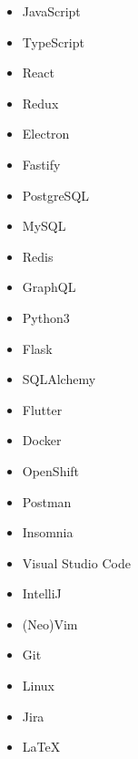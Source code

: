 

\begin{multicols}{3}
	\begin{itemize}
		\item JavaScript
		\item TypeScript
		\item React
		\item Redux
		\item Electron
		\item Fastify
		\item PostgreSQL
		\item MySQL
		\item Redis
		\item GraphQL
		\item Python3
		\item Flask
		\item SQLAlchemy
		\item Flutter
		\item Docker
		\item OpenShift
		\item Postman
		\item Insomnia
		\item Visual Studio Code
		\item IntelliJ
		\item (Neo)Vim
		\item Git
		\item Linux
		\item Jira
		\item LaTeX
	\end{itemize}
\end{multicols}
